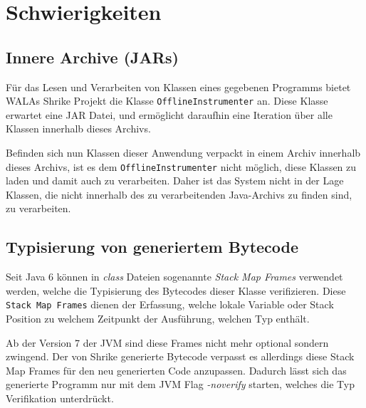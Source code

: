 \section{Schwierigkeiten}

\subsection{Innere Archive (JARs)}

Für das Lesen und Verarbeiten von Klassen eines gegebenen Programms bietet WALAs Shrike Projekt die Klasse
\texttt{OfflineInstrumenter} an. Diese Klasse erwartet eine JAR Datei, und ermöglicht daraufhin
eine Iteration über alle Klassen innerhalb dieses Archivs. 

Befinden sich nun Klassen dieser Anwendung verpackt in einem Archiv innerhalb dieses Archivs,
ist es dem \texttt{OfflineInstrumenter} nicht möglich, diese Klassen zu laden und damit auch zu verarbeiten. 
Daher ist das System nicht in der Lage Klassen, die nicht innerhalb des zu verarbeitenden Java-Archivs zu finden 
sind, zu verarbeiten.

\subsection{Typisierung von generiertem Bytecode} 

Seit Java 6 können in \textit{class} Dateien sogenannte \textit{Stack Map Frames}
verwendet werden, welche die Typisierung des Bytecodes dieser Klasse verifizieren.
Diese \texttt{Stack Map Frames} dienen der Erfassung, welche lokale Variable oder 
Stack Position zu welchem Zeitpunkt der Ausführung, welchen Typ enthält.

Ab der Version 7 der JVM sind diese Frames nicht mehr optional sondern zwingend. 
Der von Shrike generierte Bytecode verpasst es allerdings diese Stack Map Frames
für den neu generierten Code anzupassen. Dadurch lässt sich das generierte Programm 
nur mit dem JVM Flag \textit{-noverify} starten, welches die Typ Verifikation 
unterdrückt.
